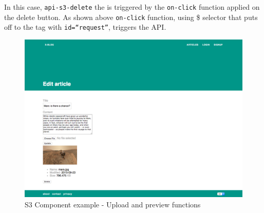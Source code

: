 In this case, \texttt{api-s3-delete} the is triggered by the \texttt{on-click} function applied on the delete button. As shown above \texttt{on-click} function, using \$ selector that puts off to the tag with \texttt{id=``request''}, triggers the API.


\begin {figure}[h]
\graphicspath{{images/chapter_s3/}}
\includegraphics[width=\textwidth]{s3_example}
\caption{S3 Component example - Upload and preview functions}
\end {figure}

